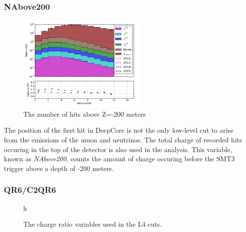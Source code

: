 \subsubsection{NAbove200}
\begin{figure}[h]
	\centering
		\includegraphics[width=2.5in]{NAbove200_log.png}
		\caption[Number of Hits Above Z=-200]{The number of hits above Z=-200 meters}
	\label{fig:nabove200_log}
\end{figure}

The position of the first hit in DeepCore is not the only low-level cut to arise from the emissions of the muon and neutrinos. 
The total charge of recorded hits occuring in the top of the detector is also used in the analysis. 
This variable, known as \emph{NAbove200}, counts the amount of charge occuring before the SMT3 trigger above a depth of -200 meters.

\subsubsection{QR6/C2QR6}
\begin{figure}{h}%
	\centering
	\caption[QR6 and C2QR6]{The charge ratio variables used in the L4 cuts.}%
	\label{fig:QR6_and_C2QR6}%
\end{figure}

